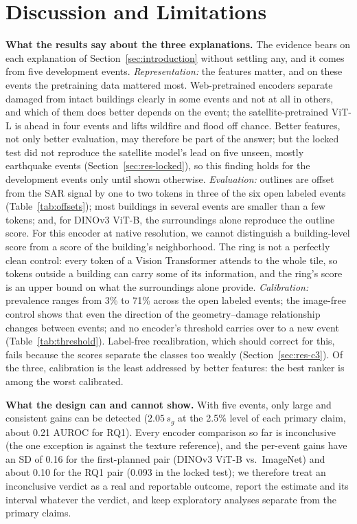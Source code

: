 \documentclass[journal]{IEEEtran}
\begin{document}
\section{Discussion and Limitations}
\label{sec:discussion}

\textbf{What the results say about the three explanations.} The evidence bears on each explanation of Section~\ref{sec:introduction} without settling any, and it comes from five development events. \emph{Representation:} the features matter, and on these events the pretraining data mattered most. Web-pretrained encoders separate damaged from intact buildings clearly in some events and not at all in others, and which of them does better depends on the event; the satellite-pretrained ViT-L is ahead in four events and lifts wildfire and flood off chance. Better features, not only better evaluation, may therefore be part of the answer; but the locked test did not reproduce the satellite model's lead on five unseen, mostly earthquake events (Section~\ref{sec:res-locked}), so this finding holds for the development events only until shown otherwise. \emph{Evaluation:} outlines are offset from the SAR signal by one to two tokens in three of the six open labeled events (Table~\ref{tab:offsets}); most buildings in several events are smaller than a few tokens; and, for DINOv3 ViT-B, the surroundings alone reproduce the outline score. For this encoder at native resolution, we cannot distinguish a building-level score from a score of the building's neighborhood. The ring is not a perfectly clean control: every token of a Vision Transformer attends to the whole tile, so tokens outside a building can carry some of its information, and the ring's score is an upper bound on what the surroundings alone provide. \emph{Calibration:} prevalence ranges from 3\% to 71\% across the open labeled events; the image-free control shows that even the direction of the geometry--damage relationship changes between events; and no encoder's threshold carries over to a new event (Table~\ref{tab:threshold}). Label-free recalibration, which should correct for this, fails because the scores separate the classes too weakly (Section~\ref{sec:res-c3}). Of the three, calibration is the least addressed by better features: the best ranker is among the worst calibrated.

\textbf{What the design can and cannot show.} With five events, only large and consistent gains can be detected ($2.05\,s_g$ at the 2.5\% level of each primary claim, about 0.21 AUROC for RQ1). Every encoder comparison so far is inconclusive (the one exception is against the texture reference), and the per-event gains have an SD of 0.16 for the first-planned pair (DINOv3 ViT-B vs.\ ImageNet) and about 0.10 for the RQ1 pair (0.093 in the locked test); we therefore treat an inconclusive verdict as a real and reportable outcome, report the estimate and its interval whatever the verdict, and keep exploratory analyses separate from the primary claims.
\end{document}
